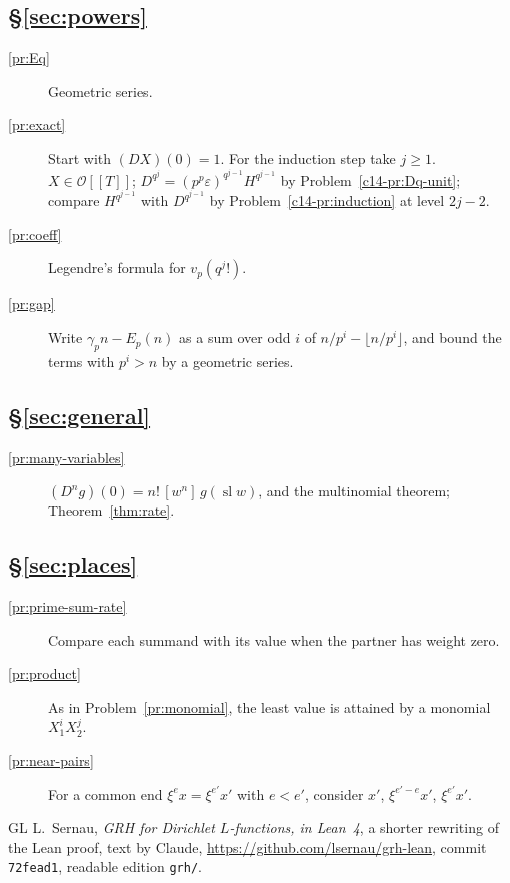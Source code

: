 \documentclass[reqno]{amsart}
\theoremstyle{definition}
\theoremstyle{plain}
\newcommand{\Oc}{\mathcal{O}}
\newcommand{\sll}{\operatorname{sl}}
\begin{document}
\subsection*{\S\ref{sec:powers}}
\begin{description}
\item[\ref{pr:Eq}] Geometric series.
\item[\ref{pr:exact}] Start with \((DX)(0) = 1\).  For the induction step take \(j \ge 1\).  \(X \in \Oc[[T]]\); \(D^{q^j} = (p^p\varepsilon)^{q^{j-1}} H^{q^{j-1}}\) by Problem~\ref{c14-pr:Dq-unit}; compare \(H^{q^{j-1}}\) with \(D^{q^{j-1}}\) by Problem~\ref{c14-pr:induction} at level \(2j-2\).
\item[\ref{pr:coeff}] Legendre's formula for \(v_p(q^j!)\).
\item[\ref{pr:gap}] Write \(\gamma_p n - E_p(n)\) as a sum over odd \(i\) of \(n/p^i - \lfloor n/p^i \rfloor\), and bound the terms with \(p^i > n\) by a geometric series.
\end{description}

\subsection*{\S\ref{sec:general}}
\begin{description}
\item[\ref{pr:many-variables}] \((D^n g)(0) = n!\,[w^n]\, g(\sll w)\), and the multinomial theorem; Theorem~\ref{thm:rate}.
\end{description}

\subsection*{\S\ref{sec:places}}
\begin{description}
\item[\ref{pr:prime-sum-rate}] Compare each summand with its value when the partner has weight zero.
\item[\ref{pr:product}] As in Problem~\ref{pr:monomial}, the least value is attained by a monomial \(X_1^iX_2^j\).
\item[\ref{pr:near-pairs}] For a common end \(\xi^e x = \xi^{e'}x'\) with \(e < e'\), consider \(x'\), \(\xi^{e'-e}x'\), \(\xi^{e'}x'\).
\end{description}

\begin{thebibliography}{GL}
 L.~Sernau, \emph{GRH for Dirichlet \(L\)-functions, in Lean~4}, a shorter rewriting of the Lean proof, text by Claude, \url{https://github.com/lsernau/grh-lean}, commit \texttt{72fead1}, readable edition \texttt{grh/}.
\end{thebibliography}
\end{document}
